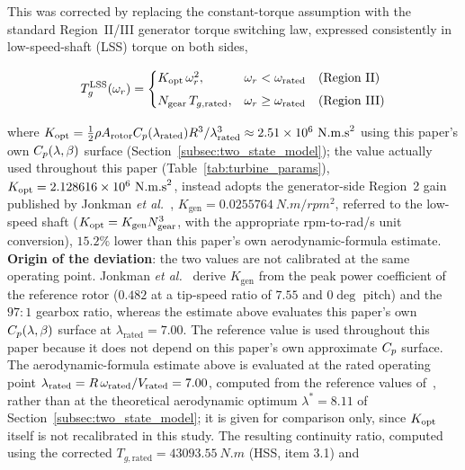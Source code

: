 This was corrected by replacing the constant-torque assumption with the
standard Region~II/III generator torque switching law, expressed
consistently in low-speed-shaft (LSS) torque on both sides,

\begin{equation}
T_g^{\text{LSS}}(\omega_r) =
\begin{cases}
K_{\text{opt}}\,\omega_r^{2}, & \omega_r < \omega_{\text{rated}} \quad \text{(Region II)} \\[4pt]
N_{\text{gear}}\,T_{g,\text{rated}}, & \omega_r \geq \omega_{\text{rated}} \quad \text{(Region III)}
\end{cases}
\label{eq:torque_switching}
\end{equation}

where $K_{\text{opt}} = \tfrac{1}{2}\rho A_{\text{rotor}} C_p(\lambda_{\text{rated}})
R^3 / \lambda_{\text{rated}}^3 \approx 2.51\times10^{6}~\text{N.m.s}^2$ using
this paper's own $C_p(\lambda,\beta)$ surface (Section~\ref{subsec:two_state_model});
the value actually used throughout this paper
(Table~\ref{tab:turbine_params}), $K_{\text{opt}}=2.128616\times10^{6}~\text{N.m.s}^2$,
{\color{auditP2}instead adopts the generator-side Region~2 gain published by
Jonkman \emph{et al.}~\cite{jonkman2009},
$K_{\text{gen}}=\SI{0.0255764}{N.m/rpm^2}$, referred to the low-speed
shaft ($K_{\text{opt}}=K_{\text{gen}}N_{\text{gear}}^3$, with the appropriate
rpm-to-rad/s unit conversion), $15.2\%$ lower than this paper's own
aerodynamic-formula estimate.\\ 
\textbf{Origin of the deviation}:
the two values are not calibrated at the same operating point.
Jonkman \emph{et al.}~\cite{jonkman2009} derive $K_{\text{gen}}$ from the
peak power coefficient of the reference rotor ($0.482$ at a tip-speed
ratio of $7.55$ and $0\deg$ pitch) and the $97{:}1$ gearbox ratio, whereas
the estimate above evaluates this paper's own $C_p(\lambda,\beta)$ surface
at $\lambda_{\text{rated}}=7.00$.} {\color{auditP2}The
reference value is used throughout this paper because it does not
depend on this paper's own approximate $C_p$ surface. The aerodynamic-formula
estimate above is evaluated at the rated operating point
$\lambda_{\text{rated}} = R\,\omega_{\text{rated}} / V_{\text{rated}} = 7.00$, computed
from the reference values of~\cite{jonkman2009}, rather than at the
theoretical aerodynamic optimum $\lambda^{*} = 8.11$ of
Section~\ref{subsec:two_state_model}; it is given for comparison only, since
$K_{\text{opt}}$ itself is not recalibrated in this study.} The
resulting continuity ratio, computed using the corrected
$T_{g,\text{rated}}=\SI{43093.55}{N.m}$ (HSS, item 3.1) and
